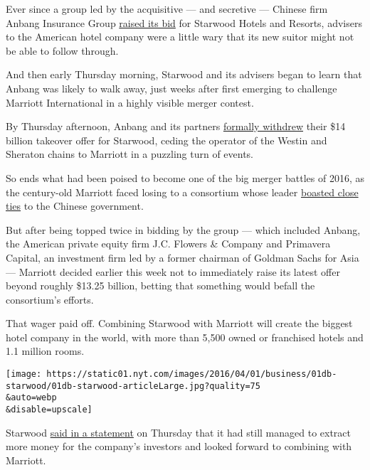 Ever since a group led by the acquisitive --- and secretive --- Chinese
firm Anbang Insurance Group
\href{http://www.nytimes.com/2016/03/29/business/dealbook/starwood-bidding-war-increases-with-higher-offer.html}{raised
its bid} for Starwood Hotels and Resorts, advisers to the American hotel
company were a little wary that its new suitor might not be able to
follow through.

And then early Thursday morning, Starwood and its advisers began to
learn that Anbang was likely to walk away, just weeks after first
emerging to challenge Marriott International in a highly visible merger
contest.

By Thursday afternoon, Anbang and its partners
\href{http://www.prnewswire.com/news-releases/anbang-jc-flowers-primavera-consortium-determines-not-to-proceed-with-its-proposal-to-acquire-starwood-300244405.html}{formally
withdrew} their \$14 billion takeover offer for Starwood, ceding the
operator of the Westin and Sheraton chains to Marriott in a puzzling
turn of events.

So ends what had been poised to become one of the big merger battles of
2016, as the century-old Marriott faced losing to a consortium whose
leader
\href{http://www.nytimes.com/2016/03/30/business/dealbook/china-anbang-starwood-wu-xiaohui.html}{boasted
close ties} to the Chinese government.

But after being topped twice in bidding by the group --- which included
Anbang, the American private equity firm J.C. Flowers \& Company and
Primavera Capital, an investment firm led by a former chairman of
Goldman Sachs for Asia --- Marriott decided earlier this week not to
immediately raise its latest offer beyond roughly \$13.25 billion,
betting that something would befall the consortium's efforts.

That wager paid off. Combining Starwood with Marriott will create the
biggest hotel company in the world, with more than 5,500 owned or
franchised hotels and 1.1 million rooms.

\texttt{[image: https://static01.nyt.com/images/2016/04/01/business/01db-starwood/01db-starwood-articleLarge.jpg?quality=75\\\&auto=webp\\\&disable=upscale]}

Starwood
\href{http://www.businesswire.com/news/home/20160331006518/en/Starwood-Hotels-Resorts-Announces-Anbang-Consortium-Withdrawn}{said
in a statement} on Thursday that it had still managed to extract more
money for the company's investors and looked forward to combining with
Marriott.

